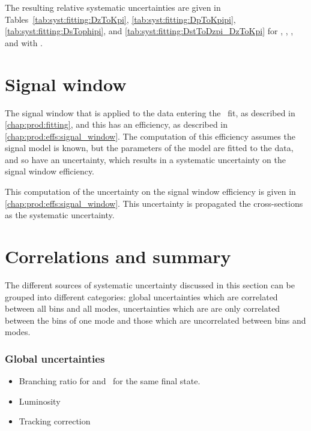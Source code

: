 The resulting relative systematic uncertainties are given in 
Tables~\ref{tab:syst:fitting:DzToKpi},
\ref{tab:syst:fitting:DpToKpipi},
\ref{tab:syst:fitting:DsTophipi}, and
\ref{tab:syst:fitting:DstToDzpi_DzToKpi} for \DzToKpi, \DpToKpipi, \DspTophipi, 
and \DstToDzpi with \DzToKpi.

\begin{table}
  \caption{%
    Relative uncertainty on the \PDzero cross-section, in \PDzero \pTy\ bins, 
    due to the arbitrary choice of fit model.
  }
  \label{tab:syst:fitting:DzToKpi}
  \centering
\end{table}

\section{Signal window}
\label{chap:prod:syst:signal_window}

The signal window that is applied to the data entering the \lnipchisq\ fit, as 
described in \cref{chap:prod:fitting}, and this has an efficiency, as 
described in \cref{chap:prod:effs:signal_window}.
The computation of this efficiency assumes the signal model is known, but the 
parameters of the model are fitted to the data, and so have an uncertainty, 
which results in a systematic uncertainty on the signal window efficiency.

This computation of the uncertainty on the signal window efficiency is given in
\cref{chap:prod:effs:signal_window}.
This uncertainty is propagated the cross-sections as the systematic 
uncertainty.

\section{Correlations and summary}
The different sources of systematic uncertainty discussed in this section can 
be grouped into different categories:
global uncertainties which are correlated between all bins and all modes, 
uncertainties which are are only correlated
between the bins of one mode and those which are uncorrelated between bins and 
modes.
\subsubsection*{Global uncertainties}
\begin{itemize}
  \item Branching ratio for \PDzero and \DstToDzpi\ for the same \PDzero final 
    state.
  \item Luminosity
  \item Tracking correction
\end{itemize}
